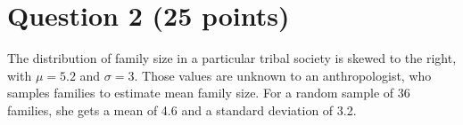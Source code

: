 \documentclass[12pt,letterpaper]{article}
\begin{document}
%
%
%
%
%
%
%
%
%
%
%
%
%
%
%
%

\section*{Question 2 (25 points)}The distribution of family size in a particular tribal society is skewed to the right, with $\mu=5.2$ and $\sigma=3$. Those values are unknown to an anthropologist, who samples families to estimate mean family size. For a random sample of 36 families, she gets a mean of 4.6 and a standard deviation of 3.2.
\end{document}

